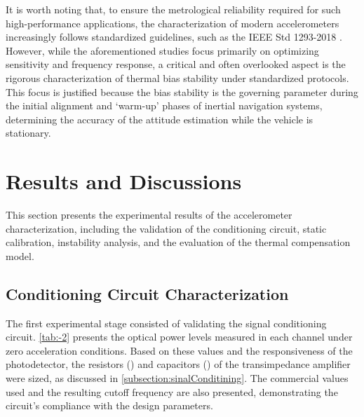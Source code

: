 \documentclass[sensors,article,accept,pdftex,moreauthors]{Definitions/mdpi}
\begin{document}
\vspace{12pt}






It is worth noting that, to ensure the metrological reliability required for such high-performance applications, the characterization of modern accelerometers increasingly follows standardized guidelines, such as the IEEE Std 1293-2018 \cite{IEEE1998}. However, while the aforementioned studies focus primarily on optimizing sensitivity and frequency response, a critical and often overlooked aspect is the rigorous characterization of thermal bias stability under standardized protocols. This focus is justified because the bias stability is the governing parameter during the initial alignment and `warm-up' phases of inertial navigation systems, determining the accuracy of the attitude estimation while the vehicle is stationary.

\section{Results and Discussions}\label{sec:resultados}

This section presents the experimental results of the accelerometer characterization, including the validation of the conditioning circuit, static calibration, instability analysis, and the evaluation of the thermal compensation model.


\subsection{Conditioning Circuit Characterization}

The first experimental stage consisted of validating the signal conditioning circuit. \cref{tab:-2} presents the optical power levels measured in each channel under zero acceleration conditions. Based on these values and the responsiveness of the photodetector, the resistors (\resistorTransimpedancia) and capacitors (\capacitorFiltroPassaBaixa) of the transimpedance amplifier were sized, as discussed in \cref{subsection:sinalConditining}. The commercial values used and the resulting cutoff frequency are also presented, demonstrating the circuit's compliance with the design parameters.
\end{document}
